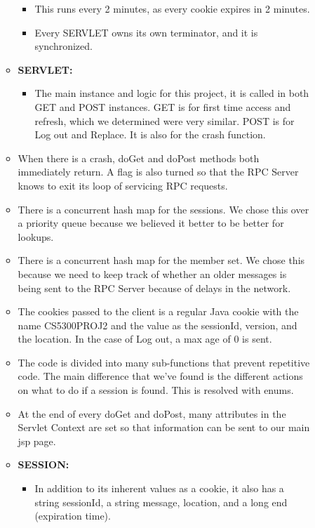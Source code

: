 \documentclass{article}
\begin{document}
\begin{description}
\begin{itemize}
\begin{itemize}
\begin{itemize}
                \item This runs every 2 minutes, as every cookie expires in 2 minutes. 
                \item Every SERVLET owns its own terminator, and it is synchronized.
              \end{itemize}
            \item \textbf{SERVLET:}
              \begin{itemize}
                \item The main instance and logic for this project, it is called in both GET and POST instances. GET is for first time access and refresh, which we determined were very similar. POST is for Log out and Replace. It is also for the crash function.
              \end{itemize}
		\item When there is a crash, doGet and doPost methods both immediately return. A flag is also turned so that the RPC Server knows to exit its loop of servicing RPC requests.
                \item There is a concurrent hash map for the sessions. We chose this over a priority queue because we believed it better to be better for lookups. 
		\item There is a concurrent hash map for the member set. We chose this because we need to keep track of whether an older messages is being sent to the RPC Server because of delays in the network.
                \item The cookies passed to the client is a regular Java cookie with the name  CS5300PROJ2 and the value as the sessionId, version, and the location. In the case of Log out, a max age of 0 is sent.
                \item The code is divided into many sub-functions that prevent repetitive code. The main difference that we've found is the different actions on what to do if a session is found. This is resolved with enums. 
		\item At the end of every doGet and doPost, many attributes in the Servlet Context are set so that information can be sent to our main jsp page.
            \item \textbf{SESSION:}
              \begin{itemize}
                 \item   In addition to its inherent values as a cookie, it also has a string sessionId, a string message, location, and a long end (expiration time). 
              \end{itemize}

\end{itemize}
\end{itemize}
\end{description}
\end{document}
